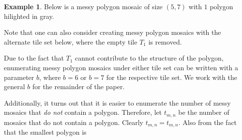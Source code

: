 \documentclass[12pt]{article}
\theoremstyle{plain}
\theoremstyle{definition}
\theoremstyle{remark}
\theoremstyle{definition}
\newtheorem{exmp}{Example}[section]
\newcommand{\cell}[4]{ \draw[thick] ( #1 , #2 ) rectangle ( #3 , #4 );}
\newcommand{\cellA}[4]{ \draw[thick] ( #1 , #2 ) rectangle ( #3 , #4 ); \draw[red, thick, densely dotted] (#3 * 0.5 + #1 * 0.5 , #2) -- (#3, #4 * 0.5 + #2 * 0.5);}
\newcommand{\cellB}[4]{ \draw[thick] ( #1 , #2 ) rectangle ( #3 , #4 ); \draw[red, thick, densely dotted] (#3 * 0.5 + #1 * 0.5 , #2) -- (#1, #4 * 0.5 + #2 * 0.5);}
\newcommand{\cellC}[4]{ \draw[thick] ( #1 , #2 ) rectangle ( #3 , #4 ); \draw[red, thick, densely dotted] (#3 * 0.5 + #1 * 0.5 , #4) -- (#1, #4 * 0.5 + #2 * 0.5);}
\newcommand{\cellD}[4]{ \draw[thick] ( #1 , #2 ) rectangle ( #3 , #4 ); \draw[red, thick, densely dotted] (#3 * 0.5 + #1 * 0.5 , #4) -- (#3, #4 * 0.5 + #2 * 0.5);}
\newcommand{\cellE}[4]{ \draw[thick] ( #1 , #2 ) rectangle ( #3 , #4 ); \draw[red, thick, densely dotted] (#3 * 0.5 + #1 * 0.5 , #2) -- (#3 * 0.5 + #1 * 0.5 , #4);}
\newcommand{\cellF}[4]{ \draw[thick] ( #1 , #2 ) rectangle ( #3 , #4 ); \draw[red, thick, densely dotted] (#3, #4 * 0.5 + #2 * 0.5) -- (#1, #4 * 0.5 + #2 * 0.5);}
\newcommand{\cellAf}[4]{\filldraw[gray!40] ( #1 , #2 ) rectangle ( #3 , #4 ); \draw[thick] ( #1 , #2 ) rectangle ( #3 , #4 ); \draw[red, thick, densely dotted] (#3 * 0.5 + #1 * 0.5 , #2) -- (#3, #4 * 0.5 + #2 * 0.5);}
\newcommand{\cellBf}[4]{\filldraw[gray!40] ( #1 , #2 ) rectangle ( #3 , #4 ); \draw[thick] ( #1 , #2 ) rectangle ( #3 , #4 ); \draw[red, thick, densely dotted] (#3 * 0.5 + #1 * 0.5 , #2) -- (#1, #4 * 0.5 + #2 * 0.5);}
\newcommand{\cellCf}[4]{\filldraw[gray!40] ( #1 , #2 ) rectangle ( #3 , #4 ); \draw[thick] ( #1 , #2 ) rectangle ( #3 , #4 ); \draw[red, thick, densely dotted] (#3 * 0.5 + #1 * 0.5 , #4) -- (#1, #4 * 0.5 + #2 * 0.5);}
\newcommand{\cellDf}[4]{\filldraw[gray!40] ( #1 , #2 ) rectangle ( #3 , #4 ); \draw[thick] ( #1 , #2 ) rectangle ( #3 , #4 ); \draw[red, thick, densely dotted] (#3 * 0.5 + #1 * 0.5 , #4) -- (#3, #4 * 0.5 + #2 * 0.5);}
\newcommand{\cellEf}[4]{\filldraw[gray!40] ( #1 , #2 ) rectangle ( #3 , #4 ); \draw[thick] ( #1 , #2 ) rectangle ( #3 , #4 ); \draw[red, thick, densely dotted] (#3 * 0.5 + #1 * 0.5 , #2) -- (#3 * 0.5 + #1 * 0.5 , #4);}
\newcommand{\cellFf}[4]{\filldraw[gray!40] ( #1 , #2 ) rectangle ( #3 , #4 ); \draw[thick] ( #1 , #2 ) rectangle ( #3 , #4 ); \draw[red, thick, densely dotted] (#3, #4 * 0.5 + #2 * 0.5) -- (#1, #4 * 0.5 + #2 * 0.5);}
\begin{document}
\begin{exmp}
\label{exmp: messy sap}
Below is a messy polygon mosaic of size $(5,7)$ with $1$ polygon hilighted in gray. 

\begin{center}
\end{center}
\end{exmp}

Note that one can also consider creating messy polygon mosaics with the alternate tile set below, where the empty tile $T_1$ is removed.

\begin{center}
\end{center}

Due to the fact that $T_1$ cannot contribute to the structure of the polygon, enumerating messy polygon mosaics under either tile set can be written with a parameter $b$, where $b=6$ or $b=7$ for the respective tile set. We work with the general $b$ for the remainder of the paper.

Additionally, it turns out that it is easier to enumerate the number of messy mosaics that \textit{do not} contain a polygon. Therefore, let $t_{m,n}$ be the number of mosaics that do not contain a polygon. Clearly $t_{m,n}=t_{m,n}.$ Also from the fact that the smallest polygon is
\end{document}
